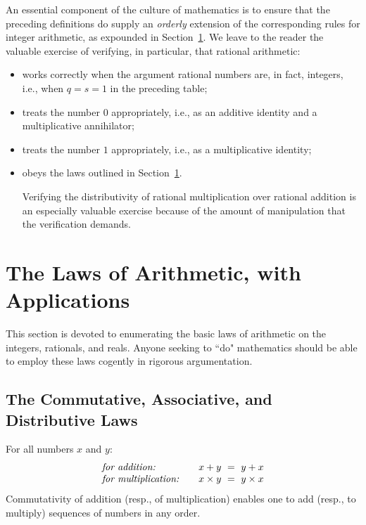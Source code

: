 An essential component of the culture of mathematics is to ensure that the preceding definitions do supply an {\em orderly} extension of the corresponding rules for integer arithmetic, as expounded in Section~\ref{sec:Arithmetic-Laws}.  We leave to the reader the valuable exercise of verifying, in particular, that rational arithmetic:
\begin{itemize}
\item
works correctly when the argument rational numbers are, in fact, integers, i.e., when $q = s = 1$ in the preceding table;
\item
treats the number $0$ appropriately, i.e., as an additive identity and a multiplicative annihilator;
\item
treats the number $1$ appropriately, i.e., as a multiplicative identity;
\item
obeys the laws outlined in Section~\ref{sec:Arithmetic-Laws}.

\smallskip

Verifying the distributivity of rational multiplication over rational addition is an especially valuable exercise because of the amount of manipulation that the verification demands.
\end{itemize}


\section{The Laws of Arithmetic, with Applications}
\label{sec:Arithmetic-Laws}

This section is devoted to enumerating the basic laws of arithmetic on the integers, rationals, and reals.  Anyone seeking to ``do" mathematics should be able to employ these laws cogently in rigorous argumentation.

\subsection{The Commutative, Associative, and Distributive Laws} 

 
 

For all numbers $x$ and $y$:
\[
\begin{array}{llc}
\mbox{\it for addition:}
  & & x+y \ = \ y+x  \index{commutativity of addition} \\
\mbox{\it for multiplication:}
  & & x \times y \ = \ y \times x \index{commutativity of multiplication}
\end{array}
\]
Commutativity of addition (resp., of multiplication) enables one to add (resp., to multiply) sequences of numbers in any order. 

